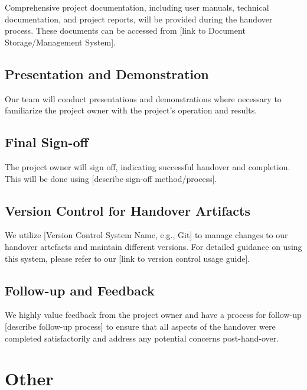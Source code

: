 \documentclass[10pt]{projectdoc}
\begin{document}
Comprehensive project documentation, including user manuals, technical documentation, and project reports, will be provided during the handover process. These documents can be accessed from [link to Document Storage/Management System].

\subsection{Presentation and Demonstration}

Our team will conduct presentations and demonstrations where necessary to familiarize the project owner with the project's operation and results.

\subsection{Final Sign-off}

The project owner will sign off, indicating successful handover and completion. This will be done using [describe sign-off method/process].

\subsection{Version Control for Handover Artifacts}

We utilize [Version Control System Name, e.g., Git] to manage changes to our handover artefacts and maintain different versions. For detailed guidance on using this system, please refer to our [link to version control usage guide].

\subsection{Follow-up and Feedback}

We highly value feedback from the project owner and have a process for follow-up [describe follow-up process] to ensure that all aspects of the handover were completed satisfactorily and address any potential concerns post-hand-over.

\newpage
\section{Other}

\newpage



\end{document}
